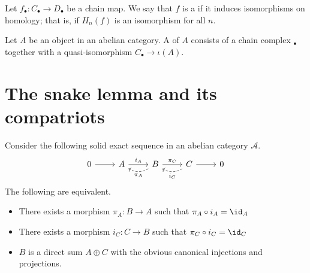 \documentclass[main.tex]{subfiles}
\begin{document}
\begin{definition}
  \label{def:quasi_isomorphism}
  Let $f_{\bullet}\colon C_{\bullet} \to D_{\bullet}$ be a chain map. We say that $f$ is a  if it induces isomorphisms on homology; that is, if $H_{n}(f)$ is an isomorphism for all $n$.
\end{definition}

\begin{definition}[resolution]
  \label{def:resolution}
  Let $A$ be an object in an abelian category. A  of $A$ consists of a chain complex $_{\bullet}$ together with a quasi-isomorphism $C_{\bullet} \to \iota(A)$.
\end{definition}

\section{The snake lemma and its compatriots}
\label{ssc:the_snake_lemma_and_its_compatriots}

\begin{lemma}
  \label{lemma:splitting_lemma}
  Consider the following solid exact sequence in an abelian category $\mathcal{A}$.
  \begin{equation*}
    \begin{tikzcd}
      0
      \arrow[r]
      & A
      \arrow[r, "i_{A}"]
      & B
      \arrow[r, "\pi_{C}"]
      \arrow[l, bend left, dashed, "\pi_{A}"]
      & C
      \arrow[r]
      \arrow[l, bend left, dashed, "i_{C}"]
      & 0
    \end{tikzcd}
  \end{equation*}
  The following are equivalent.
  \begin{itemize}
    \item There exists a morphism $\pi_{A}\colon B \to A$ such that $\pi_{A} \circ i_{A} = \id_{A}$

    \item There exists a morphism $i_{C}\colon C \to B$ such that $\pi_{C} \circ i_{C} = \id_{C}$

    \item $B$ is a direct sum $A \oplus C$ with the obvious canonical injections and projections.
  \end{itemize}
\end{lemma}
\end{document}
